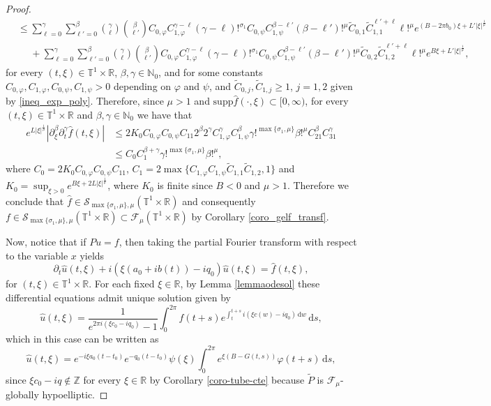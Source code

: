\documentclass[11pt,reqno]{amsart}
\numberwithin{equation}{section}
\theoremstyle{definition}
\theoremstyle{definition}
\newcommand{\supp}{\text{supp}}
\newcommand{\T}{\mathbb{T}}
\newcommand{\R}{\mathbb{R}}
\newcommand{\Z}{\mathbb{Z}}
\newcommand{\N}{\mathbb{N}}
\newcommand{\g}{\mathbb{T}^1\times\mathbb{R}}
\newcommand{\Smu}{\mathscr{F}_{\mu}(\T^1\times\R)}
\begin{document}
\begin{proof}
\begin{align*}
     &\leq\sum_{\ell=0}^\gamma\sum_{\ell'=0}^\beta  \binom{\gamma}{\ell}\binom{\beta}{\ell'}C_{0,\varphi}C_{1,\varphi}^{\gamma-\ell}(\gamma-\ell)!^{\sigma_1}C_{0,\psi}C_{1,\psi}^{\beta-\ell'}(\beta-\ell')!^{\mu}\tilde C_{0,1}\tilde C_{1,1}^{\ell'+\ell}\ell!^{\mu}e^{(B-2\pi b_0)\xi+L'|\xi|^{\frac{1}{\mu}}}\\
     &\phantom{\geq} +\sum_{\ell=0}^\gamma\sum_{\ell'=0}^\beta  \binom{\gamma}{\ell}\binom{\beta}{\ell'}C_{0,\varphi}C_{1,\varphi}^{\gamma-\ell}(\gamma-\ell)!^{\sigma_1}C_{0,\psi}C_{1,\psi}^{\beta-\ell'}(\beta-\ell')!^{\mu}\tilde C_{0,2}\tilde C_{1,2}^{\ell'+\ell}\ell!^{\mu}e^{B\xi+L'|\xi|^{\frac{1}{\mu}}},
\end{align*}
 for every $(t,\xi)\in\T^1\times\R$, $\beta,\gamma\in\N_0$, and for some constants $C_{0,\varphi}, C_{1,\varphi},C_{0,\psi},C_{1,\psi}>0$ depending on $\varphi$ and $\psi$, and $\tilde C_{0,j}, \tilde C_{1,j}\geq 1$, $j=1,2$ given by \eqref{ineq_exp_poly}. Therefore, since $\mu>1$ and $\supp \widehat{f}(\cdot,\xi)\subset [0,\infty)$, for every $(t,\xi)\in\T^1\times\R$ and $\beta,\gamma\in\N_0$ we have that
\begin{align*}
     e^{L|\xi|^{\frac{1}{\mu}}}|\partial_\xi^\beta\partial_t^\gamma\widehat{f}(t,\xi)|&\leq 2K_0C_{0,\varphi}C_{0,\psi}C_{11}2^\beta 2^\gamma C_{1,\varphi}^{\gamma}C_{1,\psi}^{\beta}\gamma!^{\max\{\sigma_1,\mu\}}\beta!^{\mu}C_{21}^{\beta}C_{31}^{\gamma}\\
     &\leq C_0C_1^{\beta+\gamma}\gamma!^{\max\{\sigma_1,\mu\}}\beta!^\mu,
\end{align*}
 where $C_0 = 2K_0C_{0,\varphi}C_{0,\psi}C_{11}$, $C_1= 2\max\{C_{1,\varphi} C_{1,\psi}\tilde C_{1,1}\tilde C_{1,2},1\} $ and $K_0=\sup_{\xi>0}e^{B\xi+2L|\xi|^{\frac{1}{\mu}}}$, where $K_0$ is finite since $B<0$ and $\mu>1$. Therefore we conclude that $\widehat{f}\in \mathcal{S}_{\max\{\sigma_1,\mu\},\mu}(\g)$ and consequently $f\in\mathcal{S}_{\max\{\sigma_1,\mu\},\mu}(\g)\subset\Smu$ by Corollary \ref{coro_gelf_transf}. 
    
    \medskip
    
    
    Now, notice that if $Pu=f$, then taking the partial Fourier transform with respect to the variable $x$ yields
    $$\partial_t\widehat{u}(t,\xi)+i(\xi(a_0+ib(t))-iq_0)\widehat{u}(t,\xi) = \widehat{f}(t,\xi),$$
    for $(t,\xi)\in\g$.    
    For each fixed $\xi\in\R$, by Lemma \ref{lemmaodesol}  these differential equations admit unique solution given by
    $$\widehat{u}(t,\xi) = \frac{1}{e^{2\pi i(\xi c_0-iq_0)}-1}\int_{0}^{2\pi}\widehat{f}(t+s)e^{\int_t^{t+s}i(\xi c(w)-iq_0)\,\mathrm{d}w}\,\mathrm{d}s,$$
    which in this case can be written as
    $$\widehat{u}(t,\xi) = e^{-i\xi a_0(t-t_0)}e^{-q_0(t-t_0)}\psi(\xi)\int_0^{2\pi}e^{\xi(B-G(t,s))}\varphi(t+s)\,\mathrm{d}s,$$
    since $\xi c_0-iq\not\in\Z$ for every $\xi\in\R$ by  Corollary \ref{coro-tube-cte} because $\tilde{P}$ is $\mathscr{F}_{\mu}$-globally hypoelliptic. 
    

\end{proof}
\end{document}
